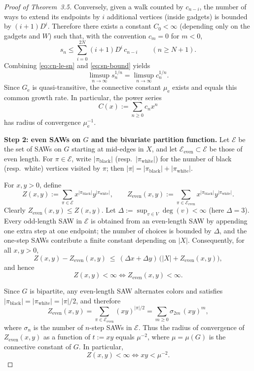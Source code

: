 \documentclass[12pt]{amsart}
\theoremstyle{plain}
\numberwithin{equation}{section}
\numberwithin{theorem}{section}
\numberwithin{figure}{section}
\begin{document}
\begin{proof}[Proof of Theorem~3.5]
Conversely, given a walk counted by $c_{n-i}$, the number of ways to extend its
endpoints by $i$ additional vertices (inside gadgets) is bounded by $(i+1)D^i$.
Therefore there exists a constant $C_0<\infty$ (depending only on the gadgets and $W$)
such that, with the convention $c_m=0$ for $m<0$,
\begin{equation}\label{eq:sn-bound}
s_n \le \sum_{i=0}^{2N} (i+1)D^i\,c_{n-i}\qquad (n\ge N+1).
\end{equation}
Combining \eqref{eq:cn-le-sn} and \eqref{eq:sn-bound} yields
\[
\limsup_{n\to\infty} s_n^{1/n}=\limsup_{n\to\infty} c_n^{1/n}.
\]
Since $G_{\mathrm e}$ is quasi-transitive, the connective constant $\mu_{\mathrm e}$ exists and
equals this common growth rate. In particular, the power series
\[
C(x):=\sum_{n\ge0} c_n x^n
\]
has radius of convergence $\mu_{\mathrm e}^{-1}$.

\medskip
\noindent\textbf{Step 2: even SAWs on $G$ and the bivariate partition function.}
Let $\mathcal E$ be the set of SAWs on $G$ starting at mid-edges in $X$,
and let $\mathcal E_{\mathrm{even}}\subset\mathcal E$ be those of even length.
For $\pi\in\mathcal E$, write $|\pi_{\mathrm{black}}|$ (resp.\ $|\pi_{\mathrm{white}}|$) for the number
of black (resp.\ white) vertices visited by $\pi$; then $|\pi|=|\pi_{\mathrm{black}}|+|\pi_{\mathrm{white}}|$.

For $x,y>0$, define
\[
Z(x,y):=\sum_{\pi\in\mathcal E} x^{|\pi_{\mathrm{black}}|}y^{|\pi_{\mathrm{white}}|},
\qquad
Z_{\mathrm{even}}(x,y):=\sum_{\pi\in\mathcal E_{\mathrm{even}}} x^{|\pi_{\mathrm{black}}|}y^{|\pi_{\mathrm{white}}|}.
\]
Clearly $Z_{\mathrm{even}}(x,y)\le Z(x,y)$.
Let $\Delta:=\sup_{v\in V}\deg(v)<\infty$ (here $\Delta=3$).
Every odd-length SAW in $\mathcal E$ is obtained from an even-length SAW by appending
one extra step at one endpoint; the number of choices is bounded by $\Delta$, and the
one-step SAWs contribute a finite constant depending on $|X|$.
Consequently, for all $x,y>0$,
\begin{equation}\label{eq:Z-even-compare}
Z(x,y)-Z_{\mathrm{even}}(x,y)\ \le\ (\Delta x+\Delta y)\,\bigl(|X|+Z_{\mathrm{even}}(x,y)\bigr),
\end{equation}
and hence
\begin{equation}\label{eq:Z-finite-iff}
Z(x,y)<\infty \iff Z_{\mathrm{even}}(x,y)<\infty.
\end{equation}

Since $G$ is bipartite, any even-length SAW alternates colors and satisfies
$|\pi_{\mathrm{black}}|=|\pi_{\mathrm{white}}|=|\pi|/2$, and therefore
\[
Z_{\mathrm{even}}(x,y)=\sum_{\pi\in\mathcal E_{\mathrm{even}}} (xy)^{|\pi|/2}
=\sum_{m\ge0} \sigma_{2m}\,(xy)^m,
\]
where $\sigma_{n}$ is the number of $n$-step SAWs in $\mathcal E$.
Thus the radius of convergence of $Z_{\mathrm{even}}(x,y)$ as a function of $t:=xy$
equals $\mu^{-2}$, where $\mu=\mu(G)$ is the connective constant of $G$.
In particular,
\begin{equation}\label{eq:Z-critical}
Z(x,y)<\infty \iff xy<\mu^{-2}.
\end{equation}


\end{proof}
\end{document}
